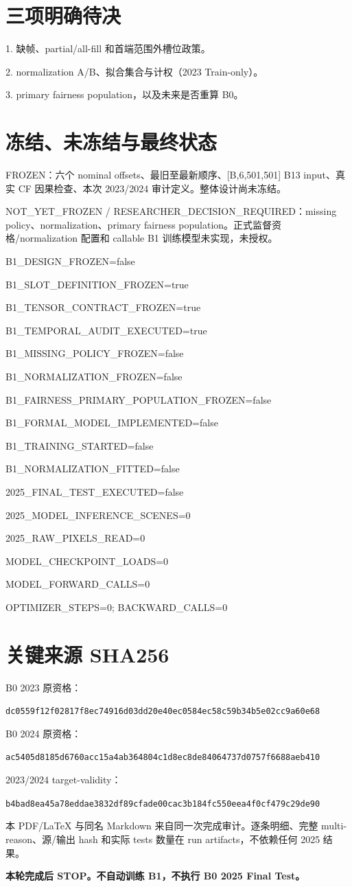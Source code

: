 \documentclass[UTF8,11pt,a4paper,fontset=windows]{ctexart}
\begin{document}
\section*{三项明确待决}
1. 缺帧、partial/all-fill 和首端范围外槽位政策。\par
2. normalization A/B、拟合集合与计权（2023 Train-only）。\par
3. primary fairness population，以及未来是否重算 B0。
\newpage
\section*{冻结、未冻结与最终状态}
FROZEN：六个 nominal offsets、最旧至最新顺序、[B,6,501,501] B13 input、真实 CF 因果检查、本次 2023/2024 审计定义。整体设计尚未冻结。

NOT\_YET\_FROZEN / RESEARCHER\_DECISION\_REQUIRED：missing policy、normalization、primary fairness population。正式监督资格/normalization 配置和 callable B1 训练模型未实现，未授权。

{\small\ttfamily\setlength{\parskip}{1.5pt}
B1\_DESIGN\_FROZEN=false\par
B1\_SLOT\_DEFINITION\_FROZEN=true\par
B1\_TENSOR\_CONTRACT\_FROZEN=true\par
B1\_TEMPORAL\_AUDIT\_EXECUTED=true\par
B1\_MISSING\_POLICY\_FROZEN=false\par
B1\_NORMALIZATION\_FROZEN=false\par
B1\_FAIRNESS\_PRIMARY\_POPULATION\_FROZEN=false\par
B1\_FORMAL\_MODEL\_IMPLEMENTED=false\par
B1\_TRAINING\_STARTED=false\par
B1\_NORMALIZATION\_FITTED=false\par
2025\_FINAL\_TEST\_EXECUTED=false\par
2025\_MODEL\_INFERENCE\_SCENES=0\par
2025\_RAW\_PIXELS\_READ=0\par
MODEL\_CHECKPOINT\_LOADS=0\par
MODEL\_FORWARD\_CALLS=0\par
OPTIMIZER\_STEPS=0; BACKWARD\_CALLS=0\par}

\section*{关键来源 SHA256}
B0 2023 原资格：\par{\footnotesize\texttt{dc0559f12f02817f8ec74916d03dd20e40ec0584ec58c59b34b5e02cc9a60e68}}\par
B0 2024 原资格：\par{\footnotesize\texttt{ac5405d8185d6760acc15a4ab364804c1d8ec8de84064737d0757f6688aeb410}}\par
2023/2024 target-validity：\par{\footnotesize\texttt{b4bad8ea45a78eddae3832df89cfade00cac3b184fc550eea4f0cf479c29de90}}\par

本 PDF/LaTeX 与同名 Markdown 来自同一次完成审计。逐条明细、完整 multi-reason、源/输出 hash 和实际 tests 数量在 run artifacts，不依赖任何 2025 结果。

\textbf{本轮完成后 STOP。不自动训练 B1，不执行 B0 2025 Final Test。}
\end{document}
